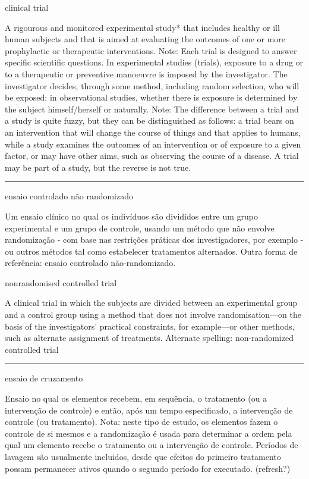 \documentclass[
  openany]{book}
\begin{document}
clinical trial

A rigourous and monitored experimental study* that includes healthy or ill human subjects and that is aimed at evaluating the outcomes of one or more prophylactic or therapeutic interventions. Note: Each trial is designed to answer specific scientific questions. In experimental studies (trials), exposure to a drug or to a therapeutic or preventive manoeuvre is imposed by the investigator. The investigator decides, through some method, including random selection, who will be exposed; in observational studies, whether there is exposure is determined by the subject himself/herself or naturally.
Note: The difference between a trial and a study is quite fuzzy, but they can be distinguished as follows: a trial bears on an intervention that will change the course of things and that applies to humans, while a study examines the outcomes of an intervention or of exposure to a given factor, or may have other aims, such as observing the course of a disease. A trial may be part of a study, but the reverse is not true.

\begin{center}\rule{0.5\linewidth}{0.5pt}\end{center}

ensaio controlado não randomizado

Um ensaio clínico no qual os indivíduos são divididos entre um grupo experimental e um grupo de controle, usando um método que não envolve randomização - com base nas restrições práticas dos investigadores, por exemplo - ou outros métodos tal como estabelecer tratamentos alternados. Outra forma de referência: ensaio controlado não-randomizado.

nonrandomised controlled trial

A clinical trial in which the subjects are divided between an experimental group and a control group using a method that does not involve randomisation---on the basis of the investigators' practical constraints, for example---or other methods, such as alternate assignment of treatments. Alternate spelling: non-randomized controlled trial

\begin{center}\rule{0.5\linewidth}{0.5pt}\end{center}

ensaio de cruzamento

Ensaio no qual os elementos recebem, em sequência, o tratamento (ou a intervenção de controle) e então, após um tempo especificado, a intervenção de controle (ou tratamento). Nota: neste tipo de estudo, os elementos fazem o controle de si mesmos e a randomização é usada para determinar a ordem pela qual um elemento recebe o tratamento ou a intervenção de controle. Períodos de lavagem são usualmente incluidos, desde que efeitos do primeiro tratamento possam permanecer ativos quando o segundo período for executado. (refresh?)
\end{document}
